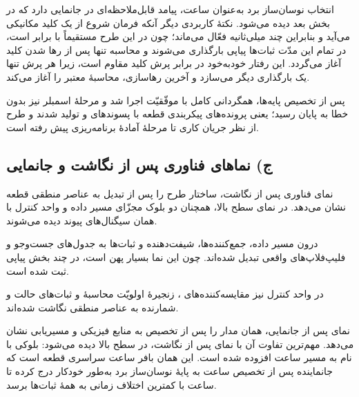 \documentclass[12pt,a4paper]{article}
\begin{document}

	انتخاب نوسان‌ساز برد به‌عنوان ساعت، پیامد قابل‌ملاحظه‌ای در جانمایی دارد که در بخش بعد دیده می‌شود. نکتهٔ کاربردی دیگر آنکه فرمان شروع از یک کلید مکانیکی می‌آید و بنابراین چند میلی‌ثانیه فعّال می‌ماند؛ چون در این طرح  مستقیماً با  برابر است، در تمام این مدّت ثبات‌ها پیاپی بارگذاری می‌شوند و محاسبه تنها پس از رها شدن کلید آغاز می‌گردد. این رفتار خودبه‌خود در برابر پرش کلید مقاوم است، زیرا هر پرش تنها یک بارگذاری دیگر می‌سازد و آخرین رهاسازی، محاسبهٔ معتبر را آغاز می‌کند.

	پس از تخصیص پایه‌ها، همگردانی کامل با موفّقیّت اجرا شد و مرحلهٔ اسمبلر نیز بدون خطا به پایان رسید؛ یعنی پرونده‌های پیکربندی قطعه با پسوندهای  و  تولید شدند و طرح از نظر جریان کاری تا مرحلهٔ آمادهٔ برنامه‌ریزی پیش رفته است.

	\subsection*{ج) نماهای فناوری پس از نگاشت و جانمایی}
	نمای فناوری پس از نگاشت، ساختار طرح را پس از تبدیل به عناصر منطقی قطعه نشان می‌دهد. در نمای سطح بالا، همچنان دو بلوک مجزّای مسیر داده و واحد کنترل با همان سیگنال‌های پیوند دیده می‌شوند.


	درون مسیر داده، جمع‌کننده‌ها، شیفت‌دهنده و ثبات‌ها به جدول‌های جست‌وجو و فلیپ‌فلاپ‌های واقعی تبدیل شده‌اند. چون این نما بسیار پهن است، در چند بخش پیاپی ثبت شده است.


	در واحد کنترل نیز مقایسه‌کننده‌های ، زنجیرهٔ اولویّت محاسبهٔ  و ثبات‌های حالت و شمارنده به عناصر منطقی نگاشت شده‌اند.


	نمای پس از جانمایی، همان مدار را پس از تخصیص به منابع فیزیکی و مسیریابی نشان می‌دهد. مهم‌ترین تفاوت آن با نمای پس از نگاشت، در سطح بالا دیده می‌شود: بلوکی با نام  به مسیر ساعت افزوده شده است. این همان بافر ساعت سراسری قطعه است که جانماینده پس از تخصیص ساعت به پایهٔ نوسان‌ساز برد به‌طور خودکار درج کرده تا ساعت با کمترین اختلاف زمانی به همهٔ ثبات‌ها برسد.
\end{document}
